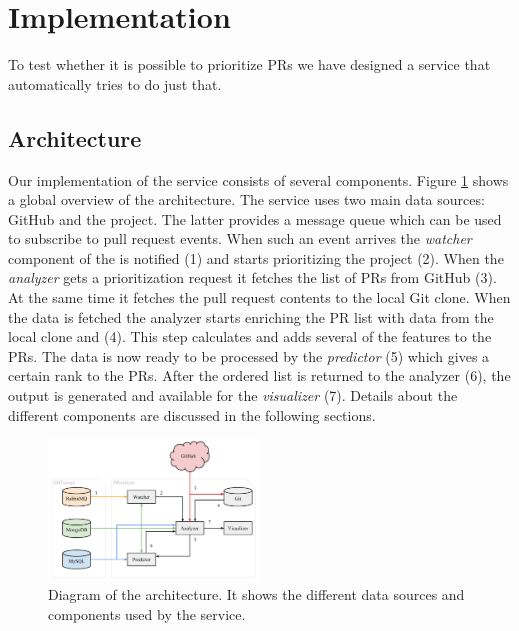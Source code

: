 \section{Implementation}
\label{sec:implementation}

To test whether it is possible to prioritize PRs we have designed a service that automatically tries to do just that.

\subsection{Architecture}
\label{sec:architecture}

Our implementation of the service consists of several components.
Figure \ref{fig:architecture} shows a global overview of the architecture.
The \prioritizer service uses two main data sources: GitHub and the \ghtorrent project.
The latter provides a message queue which can be used to subscribe to pull request events.
When such an event arrives the \emph{watcher} component of the \prioritizer is notified (1) and starts prioritizing the project (2).
When the \emph{analyzer} gets a prioritization request it fetches the list of PRs from GitHub (3).
At the same time it fetches the pull request contents to the local Git clone.
When the data is fetched the analyzer starts enriching the PR list with data from the local clone and \ghtorrent (4).
This step calculates and adds several of the features to the PRs.
The data is now ready to be processed by the \emph{predictor} (5) which gives a certain rank to the PRs.
After the ordered list is returned to the analyzer (6), the output is generated and available for the \emph{visualizer} (7).
Details about the different components are discussed in the following sections.

\begin{figure}
  \centering
  \includegraphics[width=0.5\textwidth]{../figs/architecture.pdf}
  \caption[Diagram of the architecture]
   {Diagram of the architecture. It shows the different data sources and components used by the \prioritizer service.}
  \label{fig:architecture}
\end{figure}


